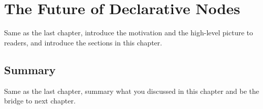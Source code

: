 \chapter{The Future of Declarative Nodes}
\label{cha:futurepart1}
Same as the last chapter, introduce the motivation and the high-level picture to
readers, and introduce the sections in this chapter.




\section{Summary}
Same as the last chapter, summary what you discussed in this chapter and
be the bridge to next chapter.